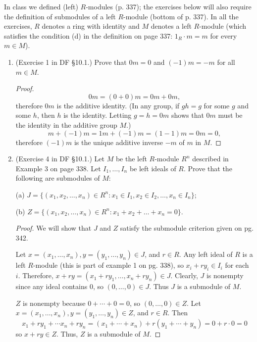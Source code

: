 \documentclass[10pt]{article}
\begin{document}
In class we defined (left) $R$-modules (p. 337); the exercises below will also require the definition of submodules of a left $R$-module (bottom of p. 337).  In all the exercises, $R$ denotes a ring with identity and $M$ denotes a left $R$-module (which satisfies the condition (d) in the definition on page 337: $1_R \cdot m = m$ for every $m \in M$).

\begin{enumerate}

\item (Exercise 1 in DF \S 10.1.) Prove that $0m = 0$ and $(-1)m=-m$ for all $m \in M$.

\begin{proof}
$$0m = (0+0)m = 0m + 0m,$$ therefore $0m$ is the additive identity. (In any group, if $gh = g$ for some $g$ and some $h$, then $h$ is the identity.  Letting $g = h = 0m$ shows that $0m$ must be the identity in the additive group $M$.)
$$
m + (-1)m = 1m + (-1)m = (1-1)m = 0m = 0,
$$
therefore $(-1)m$ is the unique additive inverse $-m$ of $m$ in $M$.
\end{proof}

\item (Exercise 4 in DF \S 10.1.) Let $M$ be the left $R$-module $R^n$ described in Example 3 on page 338.  Let $I_1,\ldots,I_n$ be left ideals of $R$.  Prove that the following are submodules of $M$:

(a) $J = \{(x_1,x_2,\ldots,x_n) \in R^n: x_1 \in I_1, x_2 \in I_2, \ldots, x_n \in I_n\}$;

(b) $Z = \{(x_1,x_2,\ldots,x_n) \in R^n: x_1+x_2+\ldots+x_n = 0\}$.

\begin{proof}
We will show that $J$ and $Z$ satisfy the submodule criterion given on pg. 342.

Let $x = (x_1, \dots , x_n), y = (y_1, \dots , y_n) \in J$, and $r \in R$.  Any left ideal of $R$ is a left $R$-module (this is part of example 1 on pg. 338), so $x_i + ry_i \in I_i$ for each $i$.  Therefore, $x + ry = (x_1 + ry_1, \dots , x_n + ry_n) \in J$.  Clearly, $J$ is nonempty since any ideal contains $0$, so $(0, \dots , 0) \in J$.  Thus $J$ is a submodule of $M$.

$Z$ is nonempty because $0 + \cdots + 0 = 0$, so $(0, \dots , 0) \in Z$.  Let $x = (x_1, \dots , x_n), y = (y_1, \dots , y_n) \in Z$, and $r \in R$.  Then $$x_1 + ry_1 + \cdots x_n + ry_n = (x_1 + \cdots + x_n) + r(y_1 + \cdots + y_n) = 0 + r \cdot 0 = 0$$
so $x+ ry \in Z$.  Thus, $Z$ is a submodule of $M$.


\end{proof}
\end{enumerate}
\end{document}
